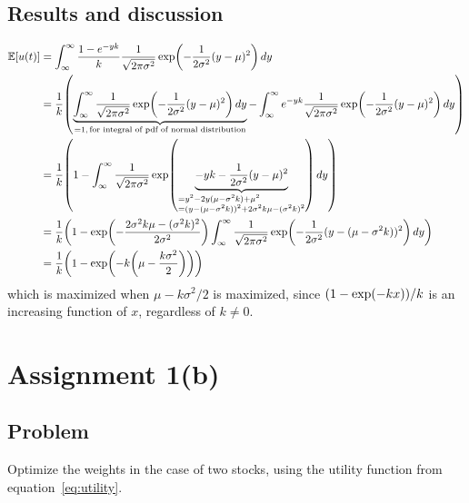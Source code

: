\documentclass[11pt, a4paper]{article}
\let\originalleft\left
\let\originalright\right
\renewcommand{\left}{\mathopen{}\mathclose\bgroup\originalleft}
\renewcommand{\right}{\aftergroup\egroup\originalright}
\begin{document}
\subsection{Results and discussion}
\begin{align*}
	\mathbb E[u(t)] &= \int_\infty^\infty \frac{1 - e^{-yk}}k \frac1{\sqrt{2\pi\sigma^2}}
		\exp\left(-\frac1{2\sigma^2} (y - \mu)^2\right) \, dy \\
		&= \frac1k \left(\underbrace{\int_\infty^\infty \frac1{\sqrt{2\pi\sigma^2}} \exp\left(-\frac1{2\sigma^2} (y - \mu)^2\right) \, dy}_{=1, \, \text{for integral of pdf of normal distribution}}
		- \int_\infty^\infty e^{-yk} \frac1{\sqrt{2\pi\sigma^2}} \exp\left(-\frac1{2\sigma^2} (y - \mu)^2\right) \, dy\right) \\
		&= \frac1k \left(1 - \int_\infty^\infty \frac1{\sqrt{2\pi\sigma^2}}
			\exp\left(\underbrace{-yk - \frac1{2\sigma^2} (y - \mu)^2}_{\begin{subarray}{1}
				= y^2 - 2y(\mu - \sigma^2k) + \mu^2 \\
				= (y - (\mu - \sigma^2k))^2 + 2\sigma^2k\mu - (\sigma^2k)^2
			\end{subarray}}\right) \, dy\right) \\
		&= \frac1k \left(1 - \exp\left(-\frac{2\sigma^2k\mu - (\sigma^2k)^2}{2\sigma^2}\right)
			\int_\infty^\infty \frac1{\sqrt{2\pi\sigma^2}} \exp\left(-\frac1{2\sigma^2} (y - (\mu - \sigma^2k))^2\right) \, dy\right) \\
		&= \frac1k \left(1 - \exp\left(-k \left(\mu - \frac{k\sigma^2}2\right)\right)\right)
\end{align*}
which is maximized when $\mu - k\sigma^2/2$ is maximized, since
$\left(1 - \exp\left(-k x\right)\right) / k$
is an increasing function of $x$, regardless of $k \ne 0$.

\section{Assignment 1(b)}
\subsection{Problem}
Optimize the weights in the case of two stocks,
using the utility function from equation~\ref{eq:utility}.
\end{document}

